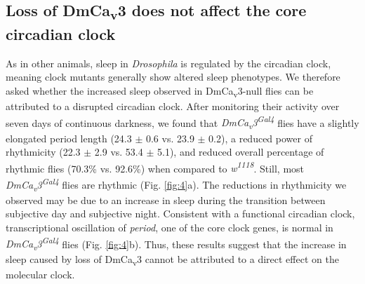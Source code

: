 \subsection*{Loss of DmCa\textsubscript{v}3 does not affect the core circadian clock}

As in other animals, sleep in \emph{Drosophila} is regulated by the circadian clock, meaning clock mutants generally show altered sleep phenotypes\cite{hendricks:2003aa, parisky:2008aa}.
We therefore asked whether the increased sleep observed in DmCa\textsubscript{v}3-null flies can be attributed to a disrupted circadian clock.
After monitoring their activity over seven days of continuous darkness, we found that \emph{DmCa\textsubscript{v}3\textsuperscript{Gal4}} flies have a slightly elongated period length (24.3 $\pm$ 0.6 vs. 23.9 $\pm$ 0.2), a reduced power of rhythmicity (22.3 $\pm$ 2.9 vs. 53.4 $\pm$ 5.1), and reduced overall percentage of rhythmic flies (70.3\% vs. 92.6\%) when compared to \emph{w\textsuperscript{1118}}.
Still, most \emph{DmCa\textsubscript{v}3\textsuperscript{Gal4}} flies are rhythmic (Fig. \ref{fig:4}a).
The reductions in rhythmicity we observed may be due to an increase in sleep during the transition between subjective day and subjective night.
Consistent with a functional circadian clock, transcriptional oscillation of \emph{period}, one of the core clock genes, is normal in \emph{DmCa\textsubscript{v}3\textsuperscript{Gal4}} flies (Fig. \ref{fig:4}b).
Thus, these results suggest that the increase in sleep caused by loss of DmCa\textsubscript{v}3 cannot be attributed to a direct effect on the molecular clock.

  